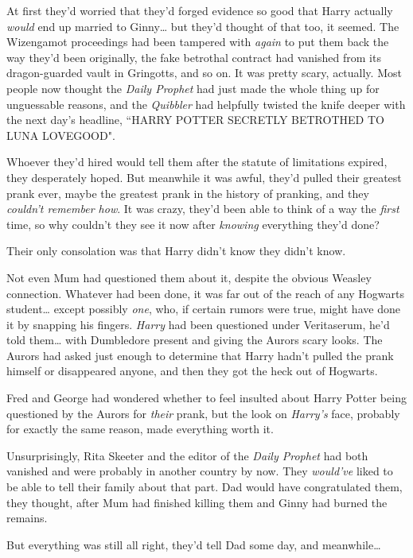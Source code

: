 At first they'd worried that they'd forged evidence so good that Harry actually \emph{would} end up married to Ginny{\ldots} but they'd thought of that too, it seemed. The Wizengamot proceedings had been tampered with \emph{again} to put them back the way they'd been originally, the fake betrothal contract had vanished from its dragon-guarded vault in Gringotts, and so on. It was pretty scary, actually. Most people now thought the \emph{Daily Prophet} had just made the whole thing up for unguessable reasons, and the \emph{Quibbler} had helpfully twisted the knife deeper with the next day's headline, ``HARRY POTTER SECRETLY BETROTHED TO LUNA LOVEGOOD".

Whoever they'd hired would tell them after the statute of limitations expired, they desperately hoped. But meanwhile it was awful, they'd pulled their greatest prank ever, maybe the greatest prank in the history of pranking, and they \emph{couldn't remember how}. It was crazy, they'd been able to think of a way the \emph{first} time, so why couldn't they see it now after \emph{knowing} everything they'd done?

Their only consolation was that Harry didn't know they didn't know.

Not even Mum had questioned them about it, despite the obvious Weasley connection. Whatever had been done, it was far out of the reach of any Hogwarts student{\ldots} except possibly \emph{one}, who, if certain rumors were true, might have done it by snapping his fingers. \emph{Harry} had been questioned under Veritaserum, he'd told them{\ldots} with Dumbledore present and giving the Aurors scary looks. The Aurors had asked just enough to determine that Harry hadn't pulled the prank himself or disappeared anyone, and then they got the heck out of Hogwarts.

Fred and George had wondered whether to feel insulted about Harry Potter being questioned by the Aurors for \emph{their} prank, but the look on \emph{Harry's} face, probably for exactly the same reason, made everything worth it.

Unsurprisingly, Rita Skeeter and the editor of the \emph{Daily Prophet} had both vanished and were probably in another country by now. They \emph{would've} liked to be able to tell their family about that part. Dad would have congratulated them, they thought, after Mum had finished killing them and Ginny had burned the remains.

But everything was still all right, they'd tell Dad some day, and meanwhile{\ldots}

